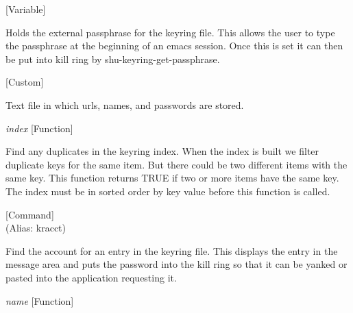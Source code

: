 \vspace{1em}
\noindent
{}
\usebox{\funcname}
 \hfill [Variable]

\begin{doc-string}
Holds the external passphrase for the keyring file.  This allows the user
to type the passphrase at the beginning of an emacs session.  Once this is
set it can then be put into kill ring by shu-keyring-get-passphrase.
\end{doc-string}

\vspace{1em}
\noindent
{}
\usebox{\funcname}
 \hfill [Custom]

\begin{doc-string}
Text file in which urls, names, and passwords are stored.
\end{doc-string}

\vspace{1em}
\noindent
{}
\usebox{\funcname}\emph{index}
 \hfill [Function]

\begin{doc-string}
Find any duplicates in the keyring index.  When the index is built we filter duplicate
keys for the same item.  But there could be two different items with the same key.  This
function returns TRUE if two or more items have the same key.  The index must be in sorted
order by key value before this function is called.
\end{doc-string}

\vspace{1em}
\noindent
{}
\usebox{\funcname}
 \hfill [Command]\\%
 (Alias: kracct)

\begin{doc-string}
Find the account for an entry in the keyring file.  This displays the entry in the message
area and puts the password into the kill ring so that it can be yanked or pasted into the application
requesting it.
\end{doc-string}

\vspace{1em}
\noindent
{}
\usebox{\funcname}\emph{name}
 \hfill [Function]

